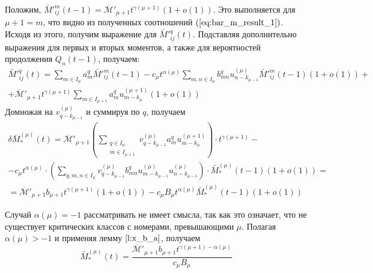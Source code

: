 \documentclass[11pt]{article}
\begin{document}
Положим, $\bar{M}'^m_{ij}(t-1) = \overline{\mathcal{M}}'_{\mu+1} t^{\gamma(\mu+1)} (1 + o(1))$. Это выполняется для $\mu + 1 = m$, что видно из полученных соотношений $(\ref{eq:bar_m_result_1})$. Исходя из этого, получим выражение для $\bar{M}'^q_{ij}(t)$. Подставляя дополнительно выражения для первых и вторых моментов, а также для вероятностей продолжения $Q_n(t-1)$, получаем:
\begin{multline}
    \bar{M}'^q_{ij}(t) = \sum_{m \in I_\mu} a^q_m \bar{M}'^m_{ij}(t-1) - c_\mu t^{\alpha(\mu)} \sum_{m,n \in I_\mu} b^q_{mn} u^{(\mu)}_{n - k_{\mu-1}} \bar{M}'^m_{ij}(t-1)(1 + o(1)) + \\
    + \overline{\mathcal{M}}'_{\mu+1} t^{\gamma(\mu+1)} \sum_{m \in I_{\mu+1}} a^q_m u^{(\mu+1)}_{m - k_\mu} (1 + o(1))
\end{multline}
Домножая на $v^{(\mu)}_{q - k_{\mu-1}}$ и суммируя по $q$, получаем
\begin{multline}
    \delta \bar{M}^{(\mu)}_*(t) = \overline{\mathcal{M}}'_{\mu+1} \left( \sum_{\substack{q \in I_\mu \\ m \in I_{\mu+1}}} v^{(\mu)}_{q - k_{\mu-1}} a^q_m u^{(\mu+1)}_{m - k_\mu} \right) \cdot t^{\gamma(\mu+1)} - \\
    - c_\mu t^{\alpha(\mu)} \cdot \left( \sum_{q,m,n \in I_\mu} v^{(\mu)}_{q - k_{\mu-1}} b^q_{mn} u^{(\mu)}_{m - k_{\mu-1}} u^{(\mu)}_{n - k_{\mu-1}} \right) \cdot \bar{M}^{(\mu)}_*(t-1) (1 + o(1)) = \\
    = \overline{\mathcal{M}}'_{\mu+1} b_{\mu+1} t^{\gamma(\mu+1)} (1 + o(1)) - c_\mu B_\mu t^{\alpha(\mu)} \bar{M}^{(\mu)}_*(t-1) (1 + o(1))
\end{multline}

Случай $\alpha(\mu) = -1$ рассматривать не имеет смысла, так как это означает, что не существует критических классов с номерами, превышающими $\mu$. Полагая $\alpha(\mu) > -1$ и применяя лемму $\ref{l:x_b_a}$, получаем
\begin{equation}
\label{eq:bar_m_result_2}
    \bar{M}^{(\mu)}_*(t) = \frac{ \overline{\mathcal{M}}'_{\mu+1} b_{\mu+1} t^{\gamma(\mu+1) - \alpha(\mu)} }{ c_\mu B_\mu }
\end{equation}
\end{document}
